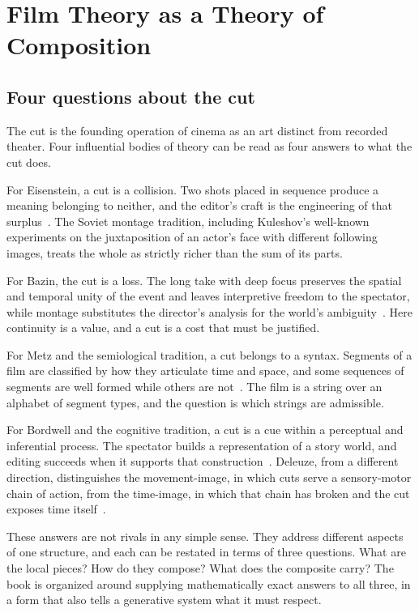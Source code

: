 \chapter{Film Theory as a Theory of Composition}
\label{ch:intro}

\section{Four questions about the cut}

The cut is the founding operation of cinema as an art distinct from recorded theater. Four influential bodies of theory can be read as four answers to what the cut does.

For Eisenstein, a cut is a collision. Two shots placed in sequence produce a meaning belonging to neither, and the editor's craft is the engineering of that surplus~\cite{eisenstein1949}. The Soviet montage tradition, including Kuleshov's well-known experiments on the juxtaposition of an actor's face with different following images, treats the whole as strictly richer than the sum of its parts.

For Bazin, the cut is a loss. The long take with deep focus preserves the spatial and temporal unity of the event and leaves interpretive freedom to the spectator, while montage substitutes the director's analysis for the world's ambiguity~\cite{bazin1967}. Here continuity is a value, and a cut is a cost that must be justified.

For Metz and the semiological tradition, a cut belongs to a syntax. Segments of a film are classified by how they articulate time and space, and some sequences of segments are well formed while others are not~\cite{metz1974}. The film is a string over an alphabet of segment types, and the question is which strings are admissible.

For Bordwell and the cognitive tradition, a cut is a cue within a perceptual and inferential process. The spectator builds a representation of a story world, and editing succeeds when it supports that construction~\cite{bordwell1985}. Deleuze, from a different direction, distinguishes the movement-image, in which cuts serve a sensory-motor chain of action, from the time-image, in which that chain has broken and the cut exposes time itself~\cite{deleuze1986,deleuze1989}.

These answers are not rivals in any simple sense. They address different aspects of one structure, and each can be restated in terms of three questions. What are the local pieces? How do they compose? What does the composite carry? The book is organized around supplying mathematically exact answers to all three, in a form that also tells a generative system what it must respect.

